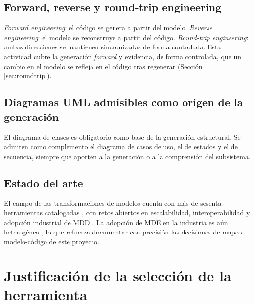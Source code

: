 \documentclass[11pt,a4paper]{article}
\begin{document}
\subsection{Forward, reverse y round-trip engineering}
\textit{Forward engineering}: el código se genera a partir del modelo.
\textit{Reverse engineering}: el modelo se reconstruye a partir del código.
\textit{Round-trip engineering}: ambas direcciones se mantienen sincronizadas de
forma controlada. Esta actividad cubre la generación \textit{forward} y
evidencia, de forma controlada, que un cambio en el modelo se refleja en el
código tras regenerar (Sección \ref{sec:roundtrip}).

\subsection{Diagramas UML admisibles como origen de la generación}
El diagrama de clases es obligatorio como base de la generación estructural.
Se admiten como complemento el diagrama de casos de uso, el de estados y el de
secuencia, siempre que aporten a la generación o a la comprensión del
subsistema.

\subsection{Estado del arte}
El campo de las transformaciones de modelos cuenta con más de sesenta
herramientas catalogadas \cite{kahani2019}, con retos abiertos en
escalabilidad, interoperabilidad y adopción industrial de MDD
\cite{bucchiarone2020}. La adopción de MDE en la industria es aún heterogénea
\cite{whittle2014}, lo que refuerza documentar con precisión las decisiones de
mapeo modelo-código de este proyecto.

\section{Justificación de la selección de la herramienta}
\label{sec:justificacion}
\end{document}
